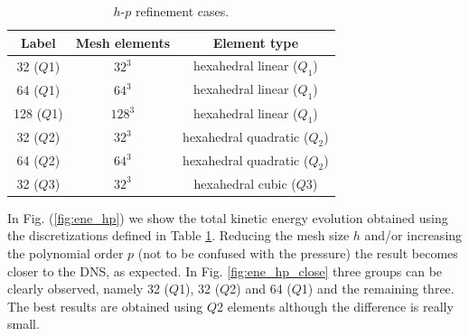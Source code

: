 \begin{table}[h]
\centering
\begin{tabular}{ccc}
\hline
Label&Mesh elements&Element type\\
\hline
32 ($Q$1)&$32^3$&hexahedral linear ($Q_1$)\\
64 ($Q$1)&$64^3$&hexahedral linear ($Q_1$)\\
128 ($Q$1)&$128^3$&hexahedral linear ($Q_1$)\\
32 ($Q$2)&$32^3$&hexahedral quadratic ($Q_2$)\\
64 ($Q$2)&$64^3$&hexahedral quadratic ($Q_2$)\\
32 ($Q$3)&$32^3$&hexahedral cubic ($Q3$)\\
\hline
\end{tabular}
\caption{$h$-$p$ refinement cases.}
\label{table:refinement}
\end{table}


In Fig. (\ref{fig:ene_hp}) we show the total kinetic energy evolution obtained using the discretizations defined in Table \ref{table:refinement}. Reducing the mesh size $h$ and/or increasing the polynomial order $p$ (not to be confused with the pressure) the result becomes closer to the DNS, as expected. In Fig. \ref{fig:ene_hp_close} three groups can be clearly observed, namely 32 ($Q$1), 32 ($Q$2) and 64 ($Q$1) and the remaining three. The best results are obtained using $Q$2 elements although the difference is really small.

